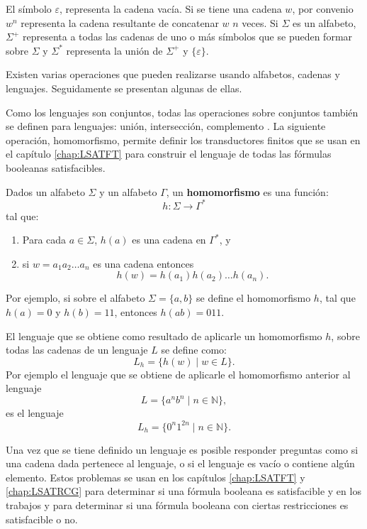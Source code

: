 El símbolo $\varepsilon$, representa la cadena vacía. Si se tiene una cadena $w$, por convenio  $w^n$ representa la cadena
resultante de concatenar $w$ $n$ veces. Si $\Sigma$ es un alfabeto, $\Sigma^{+}$ representa a todas las cadenas de uno o más 
símbolos que se pueden formar sobre $\Sigma$ y  $\Sigma^*$  representa la unión de $\Sigma^{+}$ y $\{\varepsilon\}$.

Existen varias operaciones que pueden realizarse usando alfabetos, cadenas y lenguajes. Seguidamente se presentan algunas de ellas.

Como los lenguajes son conjuntos, todas las operaciones sobre conjuntos también se definen para lenguajes: unión, intersección, complemento \cite{authomataTheory}.
La siguiente operación, homomorfismo, permite definir los transductores finitos que se usan en el capítulo \ref{chap:LSATFT} para 
construir el lenguaje de todas las fórmulas booleanas satisfacibles.

\begin{definition}
  Dados un alfabeto \( \Sigma \) y un alfabeto \( \Gamma \), un \textbf{homomorfismo} es una función:
  \[
    h: \Sigma \to \Gamma^*
  \]
  tal que:
  \begin{enumerate}
    \item Para cada \( a \in \Sigma \), \( h(a) \) es una cadena en \( \Gamma^* \), y
    \item si $w=a_1a_2\ldots a_n$ es una cadena entonces
          $$h(w)=h(a_1)h(a_2)\ldots h(a_n).$$
  \end{enumerate}
\end{definition}

Por ejemplo, si sobre el alfabeto $\Sigma=\{a,b\}$ se define el homomorfismo $h$, tal que $h(a)=0$ y $h(b)=11$, entonces
$h(ab)=011$.

El lenguaje que se obtiene como resultado de aplicarle un homomorfismo $h$, sobre todas las cadenas de un lenguaje $L$ se define como:
$$L_h=\{h(w)\mid w\in L\}.$$
Por ejemplo el lenguaje que se obtiene de aplicarle el homomorfismo anterior al lenguaje $$L=\{a^nb^n\mid n\in \mathbb{N}\},$$ es el lenguaje
$$L_h=\{0^n1^{2n}\mid n\in \mathbb{N}\}.$$

Una vez que se tiene definido un lenguaje es posible responder preguntas como si una cadena dada pertenece al lenguaje, o si el lenguaje es vacío o contiene algún elemento.
Estos problemas se usan en los capítulos \ref{chap:LSATFT} y \ref{chap:LSATRCG} para determinar si una fórmula booleana
es satisfacible y en los trabajos \cite{aCFSAT} y \cite{aSRCSAT} para determinar si una fórmula booleana con ciertas restricciones es 
satisfacible o no.

